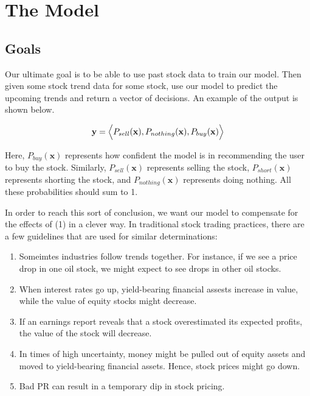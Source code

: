 \documentclass[final]{article}
\begin{document}

\section{The Model}

\subsection{Goals}

Our ultimate goal is to be able to use past stock data to train our
model. Then given some stock trend data for some stock, use our model
to predict the upcoming trends and return a vector of decisions. An
example of the output is shown below.

\[
  \mathbf{y} = \Bigl<P_{sell}(\mathbf{x}), P_{nothing}(\mathbf{x}),
  P_{buy}(\mathbf{x})\Bigr>
\]

Here, $P_{buy}(\mathbf{x})$ represents how confident the model is in
recommending the user to buy the stock. Similarly,
$P_{sell}(\mathbf{x})$ represents selling the stock,
$P_{short}(\mathbf{x})$ represents shorting the stock, and
$P_{nothing}(\mathbf{x})$ represents doing nothing. All these
probabilities should sum to 1.

In order to reach this sort of conclusion, we want our model to
compensate for the effects of (1) in a clever way. In traditional
stock trading practices, there are a few guidelines that are used for
similar determinations:
\begin{enumerate}
  \item Someimtes industries follow trends together. For instance, if
    we see a price drop in one oil stock, we might expect to see drops
    in other oil stocks.
  \item When interest rates go up, yield-bearing financial assests
    increase in value, while the value of equity stocks might
    decrease.
  \item If an earnings report reveals that a stock overestimated its
    expected profits, the value of the stock will decrease.
  \item In times of high uncertainty, money might be pulled out of
    equity assets and moved to yield-bearing financial assets. Hence,
    stock prices might go down.
  \item Bad PR can result in a temporary dip in stock pricing.
\end{enumerate}
\end{document}
